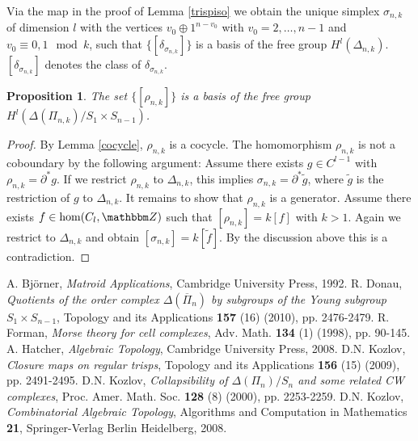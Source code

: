 \documentclass{elsarticle}
\newtheorem{prop}[df]{Proposition}
\def\Z{\mathbbm Z}
\begin{document}
Via the map in the proof of Lemma \ref{trispiso} we obtain the unique simplex $\sigma_{n,k}$ of dimension $l$ with the vertices $v_0\oplus 1^{n-v_0}$ with $v_0=2,\dots,n-1$ and $v_0\equiv 0,1\mod k$, such that $\{[\delta_{\sigma_{n,k}}]\}$ is a basis of the free group $H^l(\Delta_{n,k})$. $[\delta_{\sigma_{n,k}}]$ denotes the class of $\delta_{\sigma_{n,k}}$.
\begin{prop}
The set $\{[\rho_{n,k}]\}$ is a basis of the free group $H^l(\Delta(\Pi_{n,k})/S_1\times S_{n-1})$.
\end{prop}
\begin{proof}
By Lemma \ref{cocycle}, $\rho_{n,k}$ is a cocycle. The homomorphism $\rho_{n,k}$ is not a coboundary by the following argument: Assume there exists $g\in C^{l-1}$ with $\rho_{n,k}=\partial^*g$. If we restrict $\rho_{n,k}$ to $\Delta_{n,k}$, this implies $\sigma_{n,k}=\partial^*\widetilde g$, where $\widetilde g$ is the restriction of $g$ to $\Delta_{n,k}$. It remains to show that $\rho_{n,k}$ is a generator. Assume there exists $f\in\hom(C_l,\Z)$ such that $[\rho_{n,k}]=k[f]$ with $k>1$. Again we restrict to $\Delta_{n,k}$ and obtain $[\sigma_{n,k}]=k[\widetilde f]$. By the discussion above this is a contradiction.
\end{proof}

\begin{thebibliography}{00}
A. Bj\"orner, \textit{Matroid Applications}, Cambridge University Press, 1992.
R. Donau, \textit{Quotients of the order complex $\Delta(\overline{\Pi}_n)$ by subgroups of the Young subgroup $S_1\times S_{n-1}$}, Topology and its Applications \textbf{157} (16) (2010), pp. 2476-2479.
R. Forman, \textit{Morse theory for cell complexes}, Adv. Math. \textbf{134} (1) (1998), pp. 90-145.
A. Hatcher, \textit{Algebraic Topology}, Cambridge University Press, 2008.
D.N. Kozlov, \textit{Closure maps on regular trisps}, Topology and its Applications \textbf{156} (15) (2009), pp. 2491-2495.
D.N. Kozlov, \textit{Collapsibility of $\Delta(\Pi_n)/S_n$ and some related CW complexes}, Proc. Amer. Math. Soc. \textbf{128} (8) (2000), pp. 2253-2259.
D.N. Kozlov, \textit{Combinatorial Algebraic Topology}, Algorithms and Computation in Mathematics \textbf{21}, Springer-Verlag Berlin Heidelberg, 2008.
\end{thebibliography}
\end{document}
